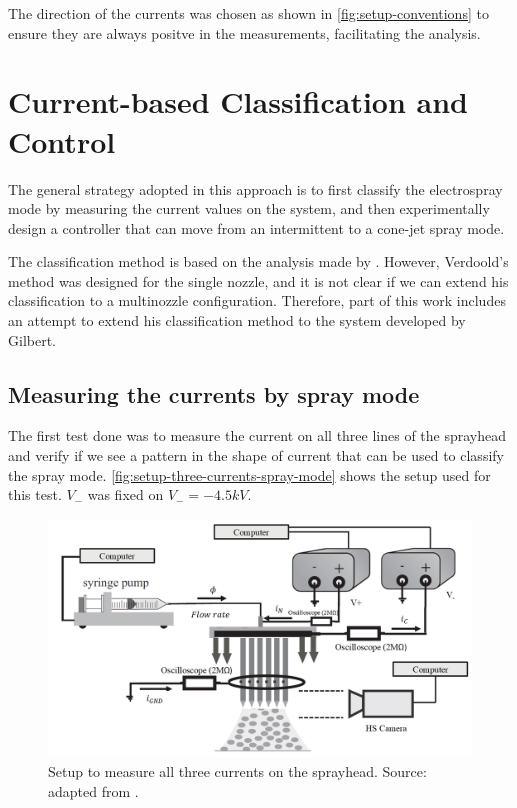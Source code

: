 \documentclass[oneside,12pt]{article}
\begin{document}
The direction of the currents was chosen as shown in \autoref{fig:setup-conventions} to ensure they are always positve 
in the measurements, facilitating the analysis.

\section{Current-based Classification and Control}\label{sec:current-based}

The general strategy adopted in this approach is to first classify the electrospray mode by measuring the current values 
on the system, and then experimentally design a controller that can move from an intermittent
to a cone-jet spray mode. 

The classification method is based on the analysis made by \cite{Verdoold2013}. However, Verdoold's method was designed for the 
single nozzle, and it is not clear if we can 
extend his classification to a multinozzle configuration. Therefore, part of this work 
includes an attempt to extend his classification method to the system developed by 
Gilbert.

\subsection{Measuring the currents by spray mode}

The first test done was to measure the current on all three lines of the sprayhead and 
verify if we see a pattern in the shape of current that can be used to classify the spray mode.
\autoref{fig:setup-three-currents-spray-mode} shows the setup used for this test. $V_-$ was fixed on 
$V_- = - 4.5 kV$.

\begin{figure}[h!]
    \centering
    \includegraphics[width=\textwidth,trim=1 1 1 1,clip]{figures/setup-three-currents-spray-mode.png}
    \caption{Setup to measure all three currents on the sprayhead. Source: adapted from \cite{Verdoold2013}.}
    \label{fig:setup-three-currents-spray-mode}
\end{figure}
\end{document}
